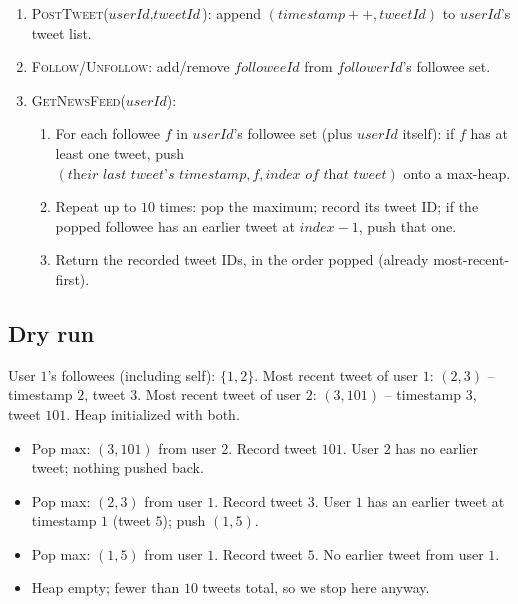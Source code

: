 \begin{enumerate}
  \item \textsc{PostTweet}($\textit{userId}, \textit{tweetId}$): append
        $(\textit{timestamp}{+}{+}, \textit{tweetId})$ to
        $\textit{userId}$'s tweet list.
  \item \textsc{Follow}/\textsc{Unfollow}: add/remove
        $\textit{followeeId}$ from $\textit{followerId}$'s followee set.
  \item \textsc{GetNewsFeed}($\textit{userId}$):
  \begin{enumerate}
    \item For each followee $f$ in $\textit{userId}$'s followee set
          (plus $\textit{userId}$ itself): if $f$ has at least one
          tweet, push $(\textit{their last tweet's timestamp}, f,
          \textit{index of that tweet})$ onto a max-heap.
    \item Repeat up to $10$ times: pop the maximum; record its tweet ID;
          if the popped followee has an earlier tweet at
          $\textit{index}-1$, push that one.
    \item Return the recorded tweet IDs, in the order popped (already
          most-recent-first).
  \end{enumerate}
\end{enumerate}

\subsection*{Dry run}


User $1$'s followees (including self): $\{1, 2\}$. Most recent tweet of
user $1$: $(2, 3)$ -- timestamp $2$, tweet $3$. Most recent tweet of user
$2$: $(3, 101)$ -- timestamp $3$, tweet $101$. Heap initialized with both.

\begin{itemize}
  \item Pop max: $(3, 101)$ from user $2$. Record tweet $101$. User $2$
        has no earlier tweet; nothing pushed back.
  \item Pop max: $(2, 3)$ from user $1$. Record tweet $3$. User $1$ has
        an earlier tweet at timestamp $1$ (tweet $5$); push $(1, 5)$.
  \item Pop max: $(1, 5)$ from user $1$. Record tweet $5$. No earlier
        tweet from user $1$.
  \item Heap empty; fewer than $10$ tweets total, so we stop here anyway.
\end{itemize}

